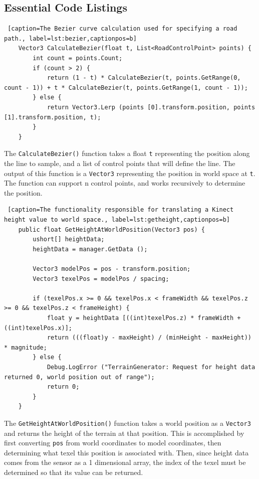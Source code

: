 \documentclass[onecolumn, draftclsnofoot,10pt, compsoc]{IEEEtran}
\begin{document}
\begin{appendices}
\section{Essential Code Listings}
\begin{lstlisting} [caption=The Bezier curve calculation used for specifying a road path., label=lst:bezier,captionpos=b]
	Vector3 CalculateBezier(float t, List<RoadControlPoint> points) {
		int count = points.Count;
		if (count > 2) {
			return (1 - t) * CalculateBezier(t, points.GetRange(0, count - 1)) + t * CalculateBezier(t, points.GetRange(1, count - 1));
		} else {
			return Vector3.Lerp (points [0].transform.position, points [1].transform.position, t);
		}
	}
\end{lstlisting}

The \texttt{CalculateBezier()} function takes a float \texttt{t} representing the position along the line to sample, and a list of control points that will define the line. The output of this function is a \texttt{Vector3} representing the position in world space at \texttt{t}. The function can support n control points, and works recursively to determine the position.

\begin{lstlisting} [caption=The functionality responsible for translating a Kinect height value to world space., label=lst:getheight,captionpos=b]
	public float GetHeightAtWorldPosition(Vector3 pos) {
		ushort[] heightData;
		heightData = manager.GetData ();

		Vector3 modelPos = pos - transform.position;
		Vector3 texelPos = modelPos / spacing;

		if (texelPos.x >= 0 && texelPos.x < frameWidth && texelPos.z >= 0 && texelPos.z < frameHeight) {
			float y = heightData [((int)texelPos.z) * frameWidth + ((int)texelPos.x)];
			return (((float)y - maxHeight) / (minHeight - maxHeight)) * magnitude;
		} else {
			Debug.LogError ("TerrainGenerator: Request for height data returned 0, world position out of range");
			return 0;
		}
	}
\end{lstlisting}

The \texttt{GetHeightAtWorldPosition()} function takes a world position as a \texttt{Vector3} and returns the height of the terrain at that position. This is accomplished by first converting \texttt{pos} from world coordinates to model coordinates, then determining what texel this position is associated with. Then, since height data comes from the sensor as a 1 dimensional array, the index of the texel must be determined so that its value can be returned.


\end{appendices}
\end{document}
